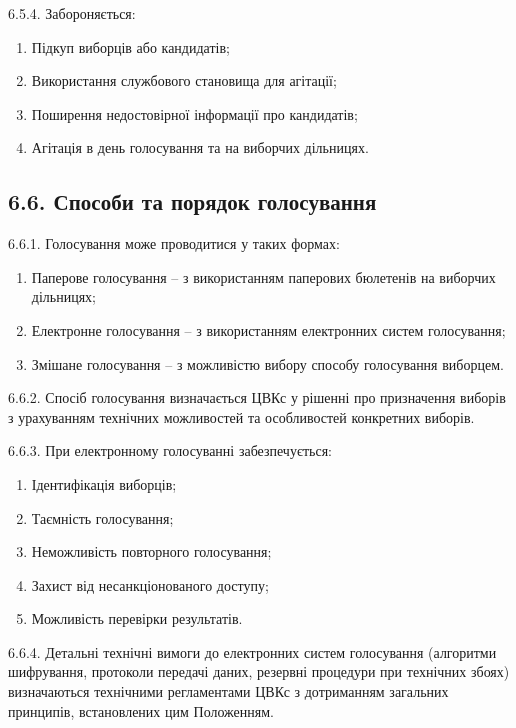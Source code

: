    6.5.4. Забороняється:

        \begin{enumerate}[label=\alph*)]
            \item Підкуп виборців або кандидатів;
            \item Використання службового становища для агітації;
            \item Поширення недостовірної інформації про кандидатів;
            \item Агітація в день голосування та на виборчих дільницях.
        \end{enumerate}

\subsection*{6.6. Способи та порядок голосування}
    6.6.1. Голосування може проводитися у таких формах:

        \begin{enumerate}[label=\alph*)]
            \item Паперове голосування -- з використанням паперових бюлетенів на виборчих дільницях;
            \item Електронне голосування -- з використанням електронних систем голосування;
            \item Змішане голосування -- з можливістю вибору способу голосування виборцем.
        \end{enumerate}

    6.6.2. Спосіб голосування визначається ЦВКс у рішенні про призначення виборів з урахуванням технічних можливостей та особливостей конкретних виборів.

    6.6.3. При електронному голосуванні забезпечується:

        \begin{enumerate}[label=\alph*)]
            \item Ідентифікація виборців;
            \item Таємність голосування;
            \item Неможливість повторного голосування;
            \item Захист від несанкціонованого доступу;
            \item Можливість перевірки результатів.
        \end{enumerate}

    6.6.4. Детальні технічні вимоги до електронних систем голосування (алгоритми шифрування, протоколи передачі даних, резервні процедури при технічних збоях) визначаються технічними регламентами ЦВКс з дотриманням загальних принципів, встановлених цим Положенням.

